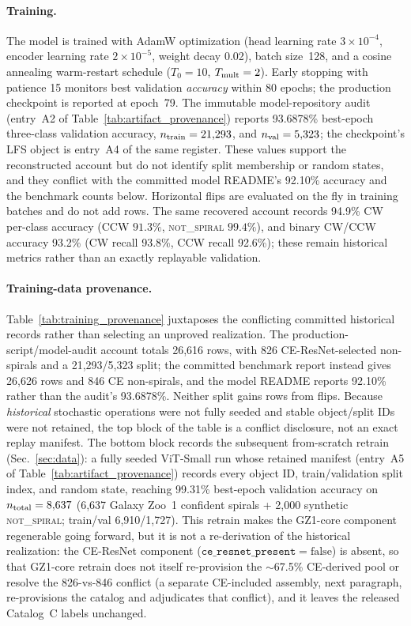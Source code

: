 \documentclass[twocolumn,linenumbers]{aastex702}
\newcommand{\NS}{\textsc{not\_spiral}}
\begin{document}
\paragraph{Training.}
The model is trained with AdamW optimization (head learning rate $3\!\times\!10^{-4}$, encoder learning rate $2\!\times\!10^{-5}$, weight decay 0.02), batch size~128, and a cosine annealing warm-restart schedule ($T_0 = 10$, $T_{\rm mult} = 2$). Early stopping with patience 15 monitors best validation \emph{accuracy} within 80 epochs; the production checkpoint is reported at epoch~79. The immutable model-repository audit (entry~A2 of Table~\ref{tab:artifact_provenance}) reports 93.6878\% best-epoch three-class validation accuracy, $n_{\rm train}=21{,}293$, and $n_{\rm val}=5{,}323$; the checkpoint's LFS object is entry~A4 of the same register. These values support the reconstructed account but do not identify split membership or random states, and they conflict with the committed model README's 92.10\% accuracy and the benchmark counts below. Horizontal flips are evaluated on the fly in training batches and do not add rows. The same recovered account records 94.9\% CW per-class accuracy (CCW $91.3\%$, \NS{} $99.4\%$), and binary CW/CCW accuracy 93.2\% (CW recall 93.8\%, CCW recall 92.6\%); these remain historical metrics rather than an exactly replayable validation.

\paragraph{Training-data provenance.}
Table~\ref{tab:training_provenance} juxtaposes the conflicting committed historical records rather than selecting an unproved realization. The production-script/model-audit account totals 26,616 rows, with 826 CE-ResNet-selected non-spirals and a 21,293/5,323 split; the committed benchmark report instead gives 26,626 rows and 846 CE non-spirals, and the model README reports 92.10\% rather than the audit's 93.6878\%. Neither split gains rows from flips. Because \emph{historical} stochastic operations were not fully seeded and stable object/split IDs were not retained, the top block of the table is a conflict disclosure, not an exact replay manifest. The bottom block records the subsequent from-scratch retrain (Sec.~\ref{sec:data}): a fully seeded ViT-Small run whose retained manifest (entry~A5 of Table~\ref{tab:artifact_provenance}) records every object ID, train/validation split index, and random state, reaching 99.31\% best-epoch validation accuracy on $n_{\rm total}=8{,}637$ (6,637 Galaxy Zoo~1 confident spirals + 2,000 synthetic \NS{}; train/val 6,910/1,727). This retrain makes the GZ1-core component regenerable going forward, but it is not a re-derivation of the historical realization: the CE-ResNet component ($\texttt{ce\_resnet\_present}\!=\!\mathrm{false}$) is absent, so that GZ1-core retrain does not itself re-provision the $\sim$67.5\% CE-derived pool or resolve the 826-vs-846 conflict (a separate CE-included assembly, next paragraph, re-provisions the catalog and adjudicates that conflict), and it leaves the released Catalog~C labels unchanged.
\end{document}
